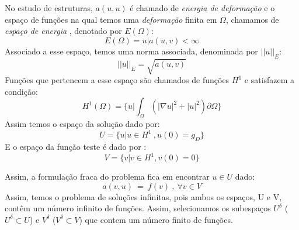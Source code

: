  No estudo de estruturas,  $a(u,u)$ é chamado de \emph{energia de deformação} e o espaço de funções na qual temos uma \emph{deformação} finita em $\Omega$, chamamos de \emph{espaço de energia} , denotado por $E(\Omega)$:
\begin{equation}
 E(\Omega) = { u | a(u,v) < \infty }
\end{equation}
  Associado a esse espaço, temos uma norma associada, denominada por $||u||_E$:
\begin{equation}
 ||u||_{E} = \sqrt{a(u,v)}
\end{equation}
 Funções que pertencem a esse espaço são chamados de funções $H^1$ e satisfazem a condição:
 \begin{equation}
 H^1(\Omega) = \bigg\{ u| \int_\Omega (|\nabla u|^2 + |u|^2) \partial \Omega  \bigg\}
 \end{equation}
  Assim temos o espaço da solução dado por:
\begin{equation}
U = \lbrace u| u \in H^1\ , u(0) = g_D  \rbrace
\end{equation}
 E o espaço da função teste é dado por :
\begin{equation}
V = \lbrace v | v \in H^1, v(0)=0 \rbrace
\end{equation}

 Assim, a formulação fraca do problema fica em encontrar $u \in U$ dado:
 \begin{equation}
 a(v,u)\ =\ f(v)\ ,\ \forall v \in V 
 \end{equation}
 Assim, temos o problema de soluções infinitas, pois ambos os espaços, U e V, contêm um número infinito de funções. Assim, selecionamos os subespaços $U^\delta$ ($ U^\delta \subset U$) e $V^\delta$ ($ V^\delta \subset V$) que contem um número finito de funções.